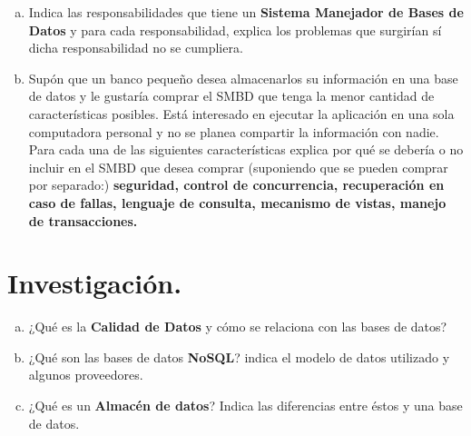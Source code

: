 \documentclass[12pt]{article}
\begin{document}
\begin{enumerate}[a. ]
            \item Indica las responsabilidades que tiene un \textbf{Sistema Manejador de Bases de Datos} y para cada responsabilidad,
            explica los problemas que surgirían sí dicha responsabilidad no se cumpliera.
            \item Supón que un banco pequeño desea almacenarlos su información en una base de datos y le gustaría comprar el
            SMBD que tenga la menor cantidad de características posibles. Está interesado en ejecutar la aplicación en una
            sola computadora personal y no se planea compartir la información con nadie. Para cada una de las siguientes
            características explica por qué se debería o no incluir en el SMBD que desea comprar (suponiendo que se pueden
            comprar por separado:) \textbf{seguridad, control de concurrencia, recuperación en caso de fallas, lenguaje de consulta,
            mecanismo de vistas, manejo de transacciones.}
          \end{enumerate}

            \section{Investigación.}
            \begin{enumerate}[a)]

            \item ¿Qué es la \textbf{Calidad de Datos} y cómo se relaciona con las bases de datos?
            \item ¿Qué son las bases de datos \textbf{NoSQL}? indica el modelo de datos utilizado y algunos proveedores.
            \item ¿Qué es un \textbf{Almacén de datos}? Indica las diferencias entre éstos y una base de datos.

            \end{enumerate}



        \begin{thebibliography}{}


      \end{thebibliography}



    
\end{document}
